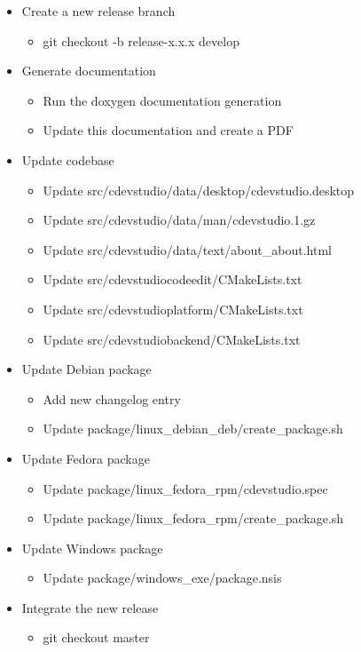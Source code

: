 \documentclass{article}
\begin{document}
\begin{itemize}
	\item Create a new release branch
	\begin{itemize}
		\item git checkout -b release-x.x.x develop
	\end{itemize}
	\item Generate documentation
	\begin{itemize}
		\item Run the doxygen documentation generation
		\item Update this documentation and create a PDF
	\end{itemize}
	\item Update codebase
	\begin{itemize}
		\item Update src/cdevstudio/data/desktop/cdevstudio.desktop
		\item Update src/cdevstudio/data/man/cdevstudio.1.gz
		\item Update src/cdevstudio/data/text/about_about.html
		\item Update src/cdevstudiocodeedit/CMakeLists.txt
		\item Update src/cdevstudioplatform/CMakeLists.txt
		\item Update src/cdevstudiobackend/CMakeLists.txt
	\end{itemize}
	\item Update Debian package
	\begin{itemize}
		\item Add new changelog entry
		\item Update package/linux_debian_deb/create_package.sh
	\end{itemize}
	\item Update Fedora package
	\begin{itemize}
		\item Update package/linux_fedora_rpm/cdevstudio.spec
		\item Update package/linux_fedora_rpm/create_package.sh
	\end{itemize}
	\item Update Windows package
	\begin{itemize}
		\item Update package/windows_exe/package.nsis
	\end{itemize}
	\item Integrate the new release
	\begin{itemize}
		\item git checkout master

\end{itemize}
\end{itemize}
\end{document}
